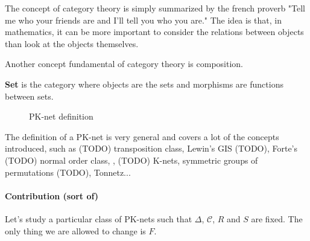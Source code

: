 \documentclass{report}
\begin{document}
The concept of category theory is simply summarized by the french proverb "Tell me who your friends are and I'll tell you who you are." The idea is that, in mathematics, it can be more important to consider the relations between objects than look at the objects themselves.

Another concept fundamental of category theory is composition.


\begin{defn}\textbf{Set} is the category where objects are the sets and morphisms are functions between sets.
    \begin{figure}
        \centering
        \caption{PK-net definition}
    \end{figure}
\end{defn}





The definition of a PK-net is very general and covers a lot of the concepts introduced, such as (TODO) transposition class, Lewin's GIS (TODO), Forte's (TODO) normal order class, , (TODO) K-nets, symmetric groups of permutations (TODO), Tonnetz...

\paragraph{Contribution (sort of)}

Let's study a particular class of PK-nets such that $\Delta$, $\mathcal{C}$, $R$ and $S$ are fixed. The only thing we are allowed to change is $F$.
\end{document}
